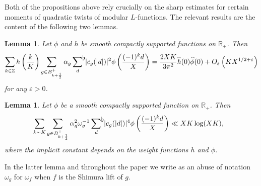 \documentclass[a4paper,10pt,twoside]{amsart}
\newtheorem{lemma}[theorem]{Lemma}
\theoremstyle{definition}
\numberwithin{equation}{section}
\newcommand\R{\mathbb{R}}
\newcommand\Z{\mathbb{Z}}
\newcommand\eps{\varepsilon}
\renewcommand\:{\colon}
\newcommand{\sumflat}{\mathop{{\sum}^{\raisebox{-3pt}{\makebox[0pt][l]{$\flat$}}}}}
\begin{document}
Both of the propositions above rely crucially on the sharp estimates for certain moments of quadratic twists of modular $L$-functions. The relevant results are the content of the following two lemmas.

\begin{lemma}\label{second-moment-with-average}
Let $\phi$ and $h$ be smooth compactly supported functions on $\mathbb R_+$.  Then
\[\sum_{k\in\Z}h\left(\frac{k}K\right)\sum_{g\in B^+_{k+\frac12}}\alpha_g\sumflat_d\, |c_g(|d|)|^2\phi\left(\frac{(-1)^k d}X\right)=\frac{2XK}{3\pi^2}\widehat h(0)\widehat\phi(0)+O_\eps\left(KX^{1/2+\eps}\right) \]
for any $\eps>0$. 
\end{lemma}

\begin{lemma}\label{fourth-moment-with-average}
Let $\phi$ be a smooth compactly supported function on $\mathbb R_+$. Then
\begin{align*}
&\sum_{k\sim K}\sum_{g\in B^+_{k+\frac12}}\alpha_g^2\omega_g^{-1}\sumflat_{d}\, |c_g(|d|)|^4\phi\left(\frac{(-1)^k d}X\right)\ll XK\log(XK),
\end{align*}
where the implicit constant depends on the weight functions $h$ and $\phi$.
\end{lemma}


\noindent In the latter lemma and throughout the paper we write as an abuse of notation $\omega_g$ for $\omega_f$ when $f$ is the Shimura lift of $g$. 
\end{document}
